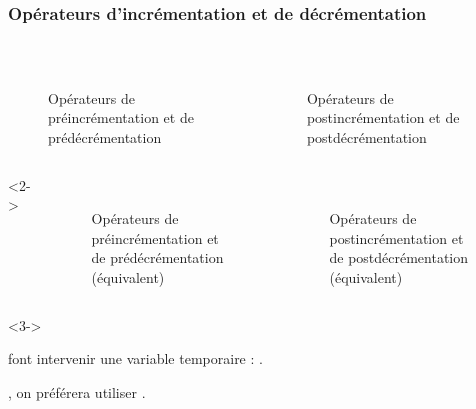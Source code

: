\documentclass{cppcourses}
\begin{document}
\begin{frame}

\frametitle{Opérateurs d'incrémentation et de décrémentation}

\begin{columns}
    \begin{column}{0.5\textwidth}
        \begin{figure}
 \\
\caption{Opérateurs de préincrémentation et de prédécrémentation}
        \end{figure}
    \end{column}
    \begin{column}{0.5\textwidth}
        \begin{figure}
 \\
\caption{Opérateurs de postincrémentation et de postdécrémentation}
\end{figure}
    \end{column}
\end{columns}


\begin{columns}<2->
    \begin{column}{0.5\textwidth}
        \begin{figure}
 \\
\caption{Opérateurs de préincrémentation et de prédécrémentation (équivalent)}
        \end{figure}
    \end{column}
    \begin{column}{0.5\textwidth}
        \begin{figure}
 \\
\caption{Opérateurs de postincrémentation et de postdécrémentation (équivalent)}
        \end{figure}
    \end{column}
\end{columns}

\begin{uncoverenv}<3->

 font intervenir une variable temporaire : .

, on préférera utiliser .

\end{uncoverenv}

\end{frame}
\end{document}
